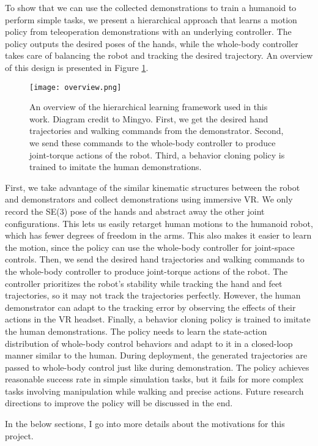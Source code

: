 To show that we can use the collected demonstrations to train a humanoid to perform simple tasks, we present a hierarchical approach that learns a motion policy from teleoperation demonstrations with an underlying controller. The policy outputs the desired poses of the hands, while the whole-body controller takes care of balancing the robot and tracking the desired trajectory. An overview of this design is presented in Figure \ref{fig:overview}.
\begin{figure}
    \centering
    \texttt{[image: overview.png]}
    \caption{An overview of the hierarchical learning framework used in this work. Diagram credit to Mingyo. First, we get the desired hand trajectories and walking commands from the demonstrator. Second, we send these commands to the whole-body controller to produce joint-torque actions of the robot. Third, a behavior cloning policy is trained to imitate the human demonstrations. }
    \label{fig:overview}
\end{figure}
First, we take advantage of the similar kinematic structures between the robot and demonstrators and collect demonstrations using immersive VR. 
We only record the SE(3) pose of the hands and abstract away the other joint configurations. This lets us easily retarget human motions to the humanoid robot, which has fewer degrees of freedom in the arms. This also makes it easier to learn the motion, since the policy can use the whole-body controller for joint-space controls. Then, we send the desired hand trajectories and walking commands to the whole-body controller to produce joint-torque actions of the robot. The controller prioritizes the robot's stability while tracking the hand and feet trajectories, so it may not track the trajectories perfectly. However, the human demonstrator can adapt to the tracking error by observing the effects of their actions in the VR headset. Finally, a behavior cloning policy is trained to imitate the human demonstrations. The policy needs to learn the state-action distribution of whole-body control behaviors and adapt to it in a closed-loop manner similar to the human. During deployment, the generated trajectories are passed to whole-body control just like during demonstration. The policy achieves reasonable success rate in simple simulation tasks, but it fails for more complex tasks involving manipulation while walking and precise actions. Future research directions to improve the policy will be discussed in the end. 

In the below sections, I go into more details about the motivations for this project.

